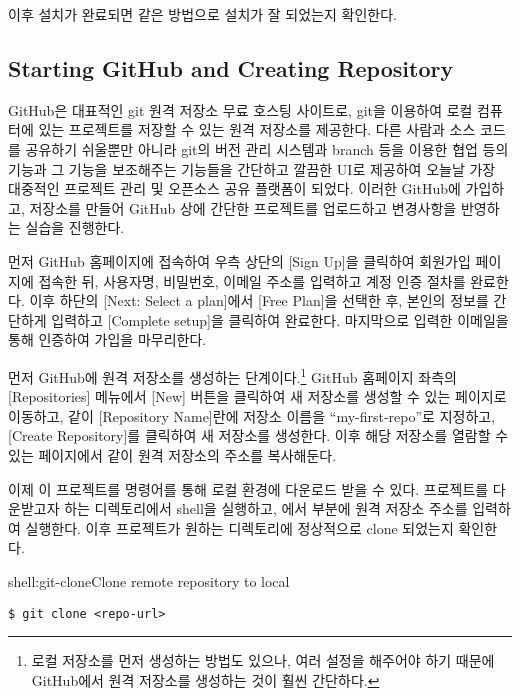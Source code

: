 이후 설치가 완료되면 \과 같은 방법으로 설치가 잘 되었는지 확인한다.
\newpage

\subsection*{Starting GitHub and Creating Repository}

GitHub은 대표적인 git 원격 저장소 무료 호스팅 사이트로, git을 이용하여 로컬 컴퓨터에 있는 프로젝트를 저장할 수 있는 원격 저장소를 제공한다. 다른 사람과 소스 코드를 공유하기 쉬울뿐만 아니라 git의 버전 관리 시스템과 branch 등을 이용한 협업 등의 기능과 그 기능을 보조해주는 기능들을 간단하고 깔끔한 UI로 제공하여 오늘날 가장 대중적인 프로젝트 관리 및 오픈소스 공유 플랫폼이 되었다. 이러한 GitHub에 가입하고, 저장소를 만들어 GitHub 상에 간단한 프로젝트를 업로드하고 변경사항을 반영하는 실습을 진행한다.

먼저 GitHub 홈페이지에 접속하여 우측 상단의 [Sign Up]을 클릭하여 회원가입 페이지에 접속한 뒤, 사용자명, 비밀번호, 이메일 주소를 입력하고 계정 인증 절차를 완료한다. 이후 하단의 [Next: Select a plan]에서 [Free Plan]을 선택한 후, 본인의 정보를 간단하게 입력하고 [Complete setup]을 클릭하여 완료한다. 마지막으로 입력한 이메일을 통해 인증하여 가입을 마무리한다.

먼저 GitHub에 원격 저장소를 생성하는 단계이다.\footnote{로컬 저장소를 먼저 생성하는 방법도 있으나, 여러 설정을 해주어야 하기 때문에 GitHub에서 원격 저장소를 생성하는 것이 훨씬 간단하다.} GitHub 홈페이지 좌측의 [Repositories] 메뉴에서 [New] 버튼을 클릭하여 새 저장소를 생성할 수 있는 페이지로 이동하고, \와 같이 [Repository Name]란에 저장소 이름을 ``my-first-repo''로 지정하고, [Create Repository]를 클릭하여 새 저장소를 생성한다. 이후 해당 저장소를 열람할 수 있는 페이지에서 \과 같이 원격 저장소의 주소를 복사해둔다.


이제 이 프로젝트를  명령어를 통해 로컬 환경에 다운로드 받을 수 있다. 프로젝트를 다운받고자 하는 디렉토리에서 shell을 실행하고, 에서  부분에 원격 저장소 주소를 입력하여 실행한다. 이후 프로젝트가 원하는 디렉토리에 정상적으로 clone 되었는지 확인한다.

\begin{shellenv}{shell:git-clone}{Clone remote repository to local}\begin{verbatim}
$ git clone <repo-url>
\end{verbatim}
\end{shellenv}
\newpage

